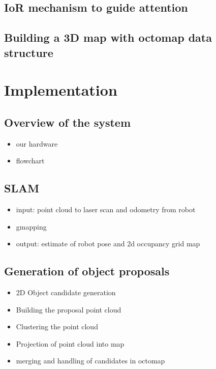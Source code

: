 \documentclass[a4paper,11pt,english]{article}
\begin{document}
\subsection{IoR mechanism to guide attention}
\subsection{Building a 3D map with octomap data structure}

\section{Implementation}

\subsection{Overview of the system}
\begin{itemize}
	\item our hardware
	\item flowchart
\end{itemize}

\subsection{SLAM}
\begin{itemize}
	\item input: point cloud to laser scan and odometry from robot
	\item gmapping
	\item output: estimate of robot pose and 2d occupancy grid map
\end{itemize}

\subsection{Generation of object proposals}

\begin{itemize}
	\item 2D Object candidate generation
	\item Building the proposal point cloud
	\item Clustering the point cloud
	\item Projection of point cloud into map
	\item merging and handling of candidates in octomap
\end{itemize}
\end{document}
